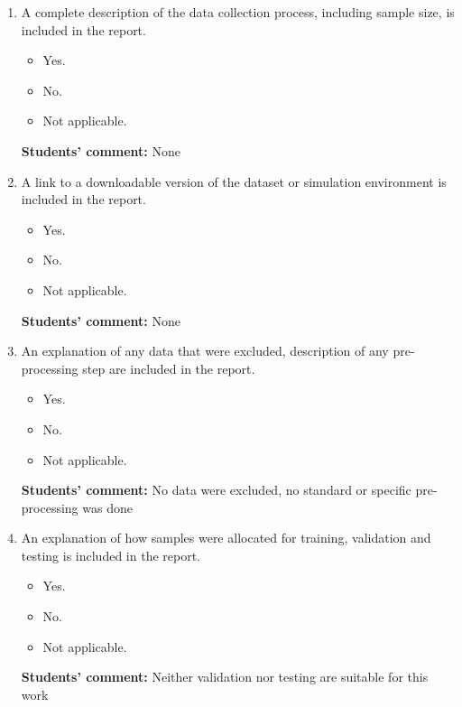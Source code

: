\documentclass[10pt]{article}
\begin{document}
\begin{enumerate}
    \item A complete description of the data collection process, including sample size, is included in the report.
    \begin{itemize}
        \item [\faCheckSquareO] Yes.
        \item [\faSquareO] No.
        \item [\faSquareO] Not applicable.
    \end{itemize}
    
    \textbf{Students' comment:} None
    
    \item A link to a downloadable version of the dataset or simulation environment is included in the report.
    \begin{itemize}
        \item [\faCheckSquareO] Yes.
        \item [\faSquareO] No.
        \item [\faSquareO] Not applicable.
    \end{itemize}
    
    \textbf{Students' comment:} None
    
    \item An explanation of any data that were excluded, description of any pre-processing step are included in the report.
    \begin{itemize}
        \item [\faSquareO] Yes.
        \item [\faSquareO] No.
        \item [\faCheckSquareO] Not applicable.
    \end{itemize}
    
    \textbf{Students' comment:} No data were excluded, no standard or specific pre-processing was done
    
    \item An explanation of how samples were allocated for training, validation and testing is included in the report.
    \begin{itemize}
        \item [\faSquareO] Yes.
        \item [\faSquareO] No.
        \item [\faCheckSquareO] Not applicable.
    \end{itemize}
    
    \textbf{Students' comment:} Neither validation nor testing are suitable for this work
    

\end{enumerate}
\end{document}

